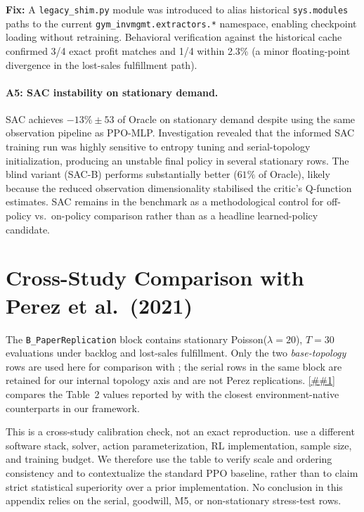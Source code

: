 \documentclass[10pt,a4paper]{article}
\providecommand{\Cref}[1]{\ref{##1}}
\begin{document}
\textbf{Fix:} A \texttt{legacy\_shim.py} module was introduced to alias
historical \texttt{sys.modules} paths to the current
\texttt{gym\_invmgmt.extractors.*} namespace, enabling checkpoint
loading without retraining. Behavioral verification against the
historical cache confirmed 3/4 exact profit matches and 1/4 within
2.3\% (a minor floating-point divergence in the lost-sales
fulfillment path).

\paragraph{A5: SAC instability on stationary demand.}
SAC achieves $-13\% \pm 53$ of Oracle on stationary demand despite
using the same observation pipeline as PPO-MLP. Investigation revealed
that the informed SAC training run was highly sensitive to entropy
tuning and serial-topology initialization, producing an unstable final
policy in several stationary rows. The blind variant (SAC-B) performs
substantially better ($61\%$ of Oracle), likely because the reduced
observation dimensionality stabilised the critic's Q-function estimates.
SAC remains in the benchmark as a methodological control for off-policy
vs.\ on-policy comparison rather than as a headline learned-policy
candidate.

\section{Cross-Study Comparison with Perez et al.\ (2021)}%
\label{sec:perez_comparison}

The \texttt{B\_PaperReplication} block contains stationary
Poisson($\lambda{=}20$), $T{=}30$ evaluations under backlog and
lost-sales fulfillment.  Only the two \emph{base-topology} rows are
used here for comparison with \citet{perez2021}; the serial
rows in the same block are retained for our internal topology axis and
are not Perez replications.  \Cref{tab:perez_comparison} compares the
Table~2 values reported by \citet{perez2021} with the closest
environment-native counterparts in our framework.

This is a cross-study calibration check, not an exact reproduction.
\citet{perez2021} use a different software stack, solver, action
parameterization, RL implementation, sample size, and training budget.
We therefore use the table to verify scale and ordering consistency
and to contextualize the standard PPO baseline, rather than to claim
strict statistical superiority over a prior implementation.  No
conclusion in this appendix relies on the serial, goodwill, M5, or
non-stationary stress-test rows.
\end{document}

